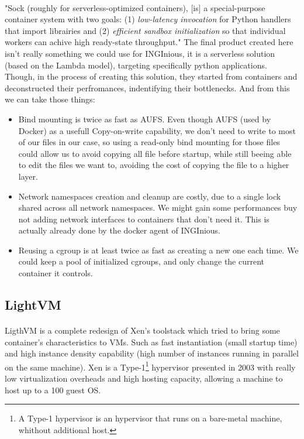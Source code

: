\paragraph{}"Sock (roughly for serverless-optimized containers), [is] a special-purpose container system with two goals: (1) \textit{low-latency invocation} for Python handlers that import librairies and (2) \textit{efficient sandbox initialization} so that individual workers can achive high ready-state throughput." \cite{oakes2018sock}  The final product created here isn't really something we could use for INGInious, it is a serverless solution (based on the Lambda model), targeting specifically python applications.  Though, in the process of creating this solution, they started from containers and deconstructed their perfromances, indentifying their bottlenecks.  And from this we can take those things:
\begin{itemize}
\renewcommand\labelitemi{--}
  \item Bind mounting is twice as fast as AUFS.  Even though AUFS (used by Docker) as a usefull Copy-on-write capability, we don't need to write to most of our files in our case, so using a read-only bind mounting for those files could allow us to avoid copying all file before startup, while still beeing able to edit the files we want to, avoiding the cost of copying the file to a higher layer.
  \item Network namespaces creation and cleanup are costly, due to a single lock shared across all network namespaces.  We might gain some performances buy not adding network interfaces to containers that don't need it.  This is actually already done by the docker agent of INGInious.
  \item Reusing a cgroup is at least twice as fast as creating a new one each time.  We could keep a pool of initialized cgroups, and only change the current container it controls.
\end{itemize}

\subsection{LightVM} 
\paragraph{}LigthVM is a complete redesign of Xen's toolstack which tried to bring some container's characteristics to VMs.  Such as fast instantiation (small startup time) and high instance density capability (high number of instances running in parallel on the same machine).\cite{manco2017my}  Xen is a Type-1\footnote{A Type-1 hypervisor is an hypervisor that runs on a bare-metal machine, whithout additional host.} hypervisor presented in 2003 with really low virtualization overheads and high hosting capacity, allowing a machine to host up to a 100 guest OS.\cite{barham2003xen}  
